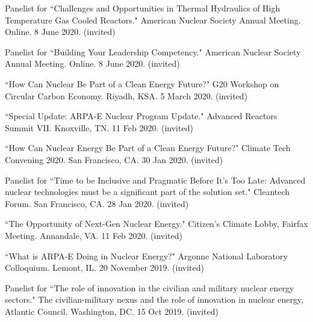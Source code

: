 \begin{bibsection}
\item Panelist for ``Challenges and Opportunities in Thermal
Hydraulics of High Temperature Gas Cooled Reactors." American Nuclear Society Annual Meeting. Online. 8 June 2020. (invited)

\item Panelist for ``Building Your Leadership Competency."
American Nuclear Society Annual Meeting. Online. 8 June 2020. (invited)


\item ``How Can Nuclear Be Part of a Clean Energy Future?" G20
Workshop on Circular Carbon Economy. Riyadh, KSA. 5 March 2020. (invited)

\item ``Special Update: ARPA-E Nuclear Program Update." Advanced Reactors Summit VII. Knoxville, TN. 11 Feb 2020.
(invited)


\item ``How Can Nuclear Energy Be Part of a Clean Energy Future?" Climate Tech Convening 2020. San Francisco, CA. 30 Jan 2020.
(invited)

\item Panelist for ``Time to be Inclusive and Pragmatic Before It’s Too Late: Advanced nuclear technologies must be a significant part of the solution set." Cleantech Forum. San Francisco, CA. 28 Jan 2020.
(invited)

\item ``The Opportunity of Next-Gen Nuclear Energy." Citizen's Climate Lobby, Fairfax Meeting. Annandale, VA. 11 Feb 2020. (invited)

\item ``What is ARPA-E Doing in Nuclear Energy?" Argonne National
Laboratory Colloquium. Lemont, IL. 20 November 2019. (invited)


\item Panelist for ``The role of innovation in the civilian and
military nuclear energy sectors." The civilian-military nexus and the role of
innovation in nuclear energy, Atlantic Council. Washington, DC. 15 Oct 2019.
(invited)


\end{bibsection}
